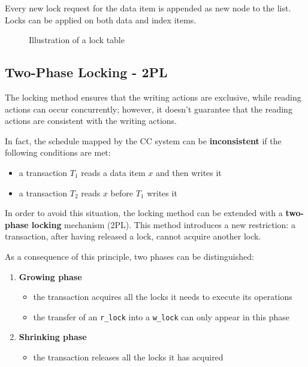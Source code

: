 \documentclass[english]{article}
\begin{document}
Every new lock request for the data item is appended as new node to the list.
Locks can be applied on both data and index items.

\begin{figure}[htbp]
  \centering
  \bigskip
  \caption{Illustration of a lock table}
  \label{fig:lock-table}
  \bigskip
\end{figure}

\subsection{Two-Phase Locking - 2PL}

The locking method ensures that the writing actions are exclusive, while reading actions can occur concurrently;
however, it doesn't guarantee that the reading actions are consistent with the writing actions.

In fact, the schedule mapped by the CC system can be \textbf{inconsistent} if the following conditions are met:

\begin{itemize}
  \item a transaction \(T_1\) reads a data item \(x\) and then writes it
  \item a transaction \(T_2\) reads \(x\) before \(T_1\) writes it
\end{itemize}

In order to avoid this situation, the locking method can be extended with a \textbf{two-phase locking} mechanism (2PL).
This method introduces a new restriction: a transaction, after having released a lock, cannot acquire another lock.

As a consequence of this principle, two phases can be distinguished:

\begin{enumerate}
  \item \textbf{Growing phase}
  \begin{itemize}
    \item the transaction acquires all the locks it needs to execute its operations
    \item the transfer of an \texttt{r\_lock} into a \texttt{w\_lock} can only appear in this phase
  \end{itemize}
  \item \textbf{Shrinking phase}
  \begin{itemize}
    \item the transaction releases all the locks it has acquired
  \end{itemize}
\end{enumerate}
\end{document}
